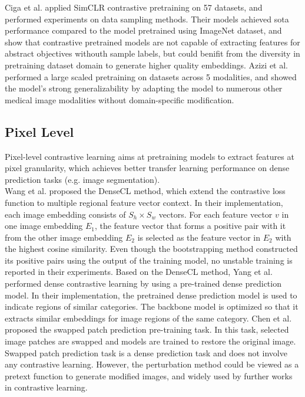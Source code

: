 \documentclass[12pt,twoside]{report}
\begin{document}
Ciga et al. \cite{sslhistopathology} applied SimCLR contrastive pretraining on 57 datasets, and performed experiments on data sampling methods. Their models achieved sota performance compared to the model pretrained using ImageNet dataset, and show that contrastive pretrained models are not capable of extracting features for abstract objectives withouth sample labels, but could benifit from the diversity in pretraining dataset domain to generate higher quality embeddings. Azizi et al.\cite{robustandefficientmedical} performed a large scaled pretraining on datasets across 5 modalities, and showed the model's strong generalizability by adapting the model to numerous other medical image modalities without domain-specific modification. 

\subsection{Pixel Level}
Pixel-level contrastive learning aims at pretraining models to extract features at pixel granularity, which achieves better transfer learning performance on dense prediction tasks (e.g. image segmentation).\\

Wang et al. \cite{denseCL} proposed the DenseCL method, which extend the contrastive loss function to multiple regional feature vector context. In their implementation, each image embedding consists of $S_h \times S_w$ vectors. For each feature vector $v$ in one image embedding $E_1$, the feature vector that forms a positive pair with it from the other image embedding $E_2$ is selected as the feature vector in $E_2$ with the highest cosine similarity. Even though the bootstrapping method constructed its positive pairs using the output of the training model, no unstable training is reported in their experiments. Based on the DenseCL method, Yang et al. \cite{conCL} performed dense contrastive learning by using a pre-trained dense prediction model. In their implementation, the pretrained dense prediction model is used to indicate regions of similar categories. The backbone model is optimized so that it extracts similar embeddings for image regions of the same category. Chen et al.\cite{selfsupervisedlearningformedical} proposed the swapped patch prediction pre-training task. In this task, selected image patches are swapped and models are trained to restore the original image. Swapped patch prediction task is a dense prediction task and does not involve any contrastive learning. However, the perturbation method could be viewed as a pretext function to generate modified images, and widely used by further works in contrastive learning. 
\end{document}
